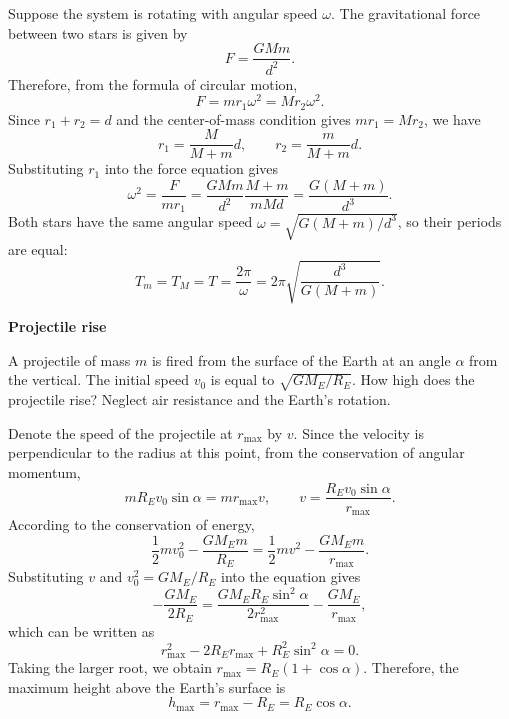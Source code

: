 \documentclass{article}
\begin{document}
\begin{solution}
	Suppose the system is rotating with angular speed $\omega$. The gravitational force between two stars is given by 
	\[ F = \frac{GMm}{d^2}. \]
	Therefore, from the formula of circular motion, 
	\[ F = mr_1\omega^2 = Mr_2\omega^2. \]
	Since $r_1+r_2=d$ and the center-of-mass condition gives $mr_1=Mr_2$, we have
	\[ r_1 = \frac{M}{M+m}d, \qquad r_2 = \frac{m}{M+m}d. \]
	Substituting $r_1$ into the force equation gives
	\[ \omega^2 = \frac{F}{mr_1}
	= \frac{GMm}{d^2}\frac{M+m}{mMd}
	= \frac{G(M+m)}{d^3}. \]
	Both stars have the same angular speed $\omega=\sqrt{G(M+m)/d^3}$, so their periods are equal:
	\[ T_m = T_M = T = \frac{2\pi}{\omega}
	= 2\pi\sqrt{\frac{d^3}{G(M+m)}}. \]
\end{solution}



\begin{problem}
\textbf{Projectile rise}

A projectile of mass $m$ is fired from the surface of the Earth at an angle $\alpha$ from the vertical. The initial speed $v_0$ is equal to $\sqrt{GM_E/R_E}$. How high does the projectile rise? Neglect air resistance and the Earth's rotation.
\begin{center}
  
\end{center}
\end{problem}

\begin{solution}
	Denote the speed of the projectile at $r_{\max}$ by $v$. Since the velocity is perpendicular to the radius at this point, from the conservation of angular momentum,
	\[ mR_Ev_0\sin\alpha = mr_{\max}v, \qquad v = \frac{R_Ev_0\sin\alpha}{r_{\max}}. \]
	According to the conservation of energy,
	\[ \frac{1}{2}mv_0^2 - \frac{GM_Em}{R_E} = \frac{1}{2}mv^2 - \frac{GM_Em}{r_{\max}}. \]
	Substituting $v$ and $v_0^2=GM_E/R_E$ into the equation gives
	\[ -\frac{GM_E}{2R_E} = \frac{GM_ER_E\sin^2\alpha}{2r_{\max}^2} - \frac{GM_E}{r_{\max}}, \]
	which can be written as
	\[ r_{\max}^2 - 2R_Er_{\max} + R_E^2\sin^2\alpha = 0. \]
	Taking the larger root, we obtain $r_{\max}=R_E(1+\cos\alpha)$. Therefore, the maximum height above the Earth's surface is
	\[ h_{\max} = r_{\max}-R_E = R_E\cos\alpha. \]
\end{solution}
\end{document}
